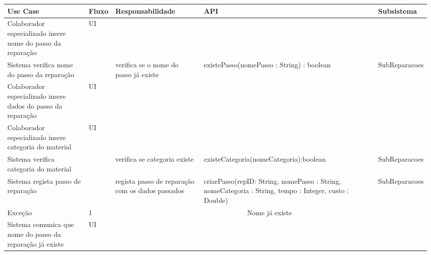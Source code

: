 \documentclass[../relatorio.tex]{subfiles}
\begin{document}
\begin{landscape}
    \begin{table}[!h]
        \centering
        \begin{tabular}{|p{5cm}|p{1cm}|p{4cm}|p{6cm}|p{3cm}|}
            \hline
            \rowcolor{gray!20!white}
            Use Case & Fluxo                                            & Responsabilidade & API & Subsistema \\
            \hline
            \rowcolor{yellow}
            Colaborador especializado insere nome do passo da reparação
                     & UI
                     & 
                     & 
                     & 
            \\
            \hline
            Sistema verifica nome do passo da reparação
                     & 
                     & verifica se o nome do passo já existe
                     & existePasso(nomePasso : String) : boolean
                     & SubReparacoes
            \\
            \hline
            \rowcolor{yellow}
            Colaborador especializado insere dados do passo da reparação
                     & UI
                     & 
                     & 
                     & 
            \\
            \hline
            \rowcolor{yellow}
            Colaborador especializado insere categoria do material
                     & UI
                     & 
                     & 
                     & 
            \\
            \hline
            Sistema verifica categoria do material
                     & 
                     & verifica se categoria existe
                     & existeCategoria(nomeCategoria):boolean
                     & SubReparacoes
            \\
            \hline
            Sistema regista passo de reparação
                     & 
                     & regista passo de reparação com os dados passados
                     & criarPasso(repID: String, nomePasso : String, nomeCategoria : String, tempo : Integer, custo : Double)
                     & SubReparacoes
            \\
            \hline
            \rowcolor{red!30}
            Exceção  & 1                                                 &  \multicolumn{3}{c}{Nome já existe}\\
            \hline
            \rowcolor{yellow}
            Sistema comunica que nome do passo da reparação já existe
                     & UI

\end{tabular}
\end{table}
\end{landscape}
\end{document}
